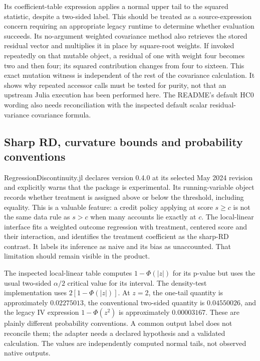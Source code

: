 Its coefficient-table expression applies a normal upper tail to the
squared statistic, despite a two-sided label. This should be treated as
a source-expression concern requiring an appropriate legacy runtime to
determine whether evaluation succeeds. Its no-argument weighted covariance
method also retrieves the stored residual vector and multiplies it in
place by square-root weights. If invoked repeatedly on that mutable
object, a residual of one with weight four becomes two and then four; its
squared contribution changes from four to sixteen. This exact mutation
witness is independent of the rest of the covariance calculation. It
shows why repeated accessor calls must be tested for purity, not that an
upstream Julia execution has been performed here. The README's default
HC0 wording also needs reconciliation with the inspected default scalar
residual-variance covariance formula.
\citep{exec23_otheriv_source_2,exec23_otheriv_reference}

\subsection{Sharp RD, curvature bounds and probability conventions}
\label{exec23:otheriv-sharp}
RegressionDiscontinuity.jl declares version 0.4.0 at its selected May 2024
revision and explicitly warns that the package is experimental. Its
running-variable object records whether treatment is assigned above or
below the threshold, including equality. This is a valuable feature: a
credit policy applying at score $s\geq c$ is not the same data rule as
$s>c$ when many accounts lie exactly at $c$. The local-linear interface
fits a weighted outcome regression with treatment, centered score and
their interaction, and identifies the treatment coefficient as the
sharp-RD contrast. It labels its inference as naive and its bias as
unaccounted. That limitation should remain visible in the product.
\citep{exec23_otheriv_source_1}

The inspected local-linear table computes $1-\Phi(|z|)$ for its p-value
but uses the usual two-sided $\alpha/2$ critical value for its interval.
The density-test implementation uses $2[1-\Phi(|z|)]$. At $z=2$, the
one-tail quantity is approximately $0.02275013$, the conventional
two-sided quantity is $0.04550026$, and the legacy IV expression
$1-\Phi(z^2)$ is approximately $0.00003167$. These are plainly different
probability conventions. A common output label does not reconcile them;
the adapter needs a declared hypothesis and a validated calculation.
The values are independently computed normal tails, not observed native
outputs. \citep{exec23_otheriv_source_1,exec23_otheriv_source_2,exec23_otheriv_reference}

